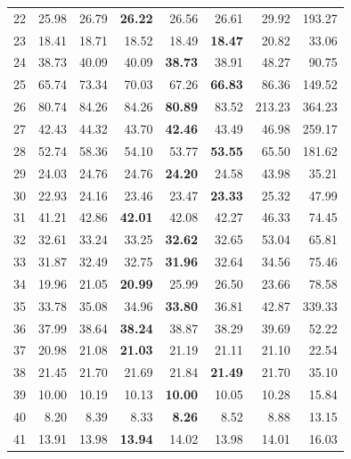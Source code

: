 \begin{table}[t]
\begin{tabular}{r r r r r r r r}
22 & 25.98  & 26.79           & \textbf{26.22}  & 26.56   & 26.61   & 29.92   & 193.27 \\
23 & 18.41  & 18.71           & 18.52           & 18.49   & \textbf{18.47}  & 20.82   & 33.06  \\
24 & 38.73  & 40.09           & 40.09           & \textbf{38.73}  & 38.91   & 48.27   & 90.75  \\
25 & 65.74  & 73.34           & 70.03           & 67.26   & \textbf{66.83}  & 86.36   & 149.52 \\
26 & 80.74  & 84.26           & 84.26           & \textbf{80.89}  & 83.52   & 213.23  & 364.23 \\
27 & 42.43  & 44.32           & 43.70           & \textbf{42.46}  & 43.49   & 46.98   & 259.17 \\
28 & 52.74  & 58.36           & 54.10           & 53.77   & \textbf{53.55}  & 65.50   & 181.62 \\
29 & 24.03  & 24.76           & 24.76           & \textbf{24.20}  & 24.58   & 43.98   & 35.21  \\
30 & 22.93  & 24.16           & 23.46           & 23.47   & \textbf{23.33}  & 25.32   & 47.99  \\
31 & 41.21  & 42.86           & \textbf{42.01}  & 42.08   & 42.27   & 46.33   & 74.45  \\
32 & 32.61  & 33.24           & 33.25           & \textbf{32.62}  & 32.65   & 53.04   & 65.81  \\
33 & 31.87  & 32.49           & 32.75           & \textbf{31.96}  & 32.64   & 34.56   & 75.46  \\
34 & 19.96  & 21.05           & \textbf{20.99}  & 25.99   & 26.50   & 23.66   & 78.58  \\
35 & 33.78  & 35.08           & 34.96           & \textbf{33.80}  & 36.81   & 42.87   & 339.33 \\
36 & 37.99  & 38.64           & \textbf{38.24}  & 38.87   & 38.29   & 39.69   & 52.22  \\
37 & 20.98  & 21.08           & \textbf{21.03}  & 21.19   & 21.11   & 21.10   & 22.54  \\
38 & 21.45  & 21.70           & 21.69           & 21.84   & \textbf{21.49}  & 21.70   & 35.10  \\
39 & 10.00  & 10.19           & 10.13           & \textbf{10.00}  & 10.05   & 10.28   & 15.84  \\
40 & 8.20   & 8.39            & 8.33            & \textbf{8.26}   & 8.52    & 8.88    & 13.15  \\
41 & 13.91  & 13.98           & \textbf{13.94}  & 14.02   & 13.98   & 14.01   & 16.03  \\

\end{tabular}
\end{table}
